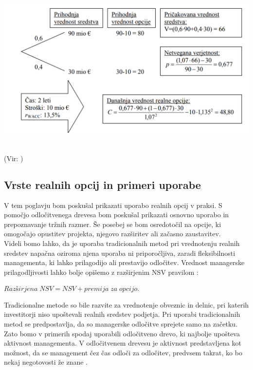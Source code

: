 \includegraphics[width=15cm, height=9cm]{binomski_model}
(Vir: \cite[str. 24]{Mohar})

\subsection{Vrste realnih opcij in primeri uporabe}
V tem poglavju bom poskušal prikazati uporabo realnih opcij v praksi. S pomočjo odločitvenega drevesa bom poskušal prikazati osnovno uporabo in prepoznavanje tržnih razmer. Še posebej se bom osredotočil na opcije, ki omogočajo opustitev projekta, njegovo razširitev ali začasno zaustavitev. \\

Videli bomo lahko, da je uporaba tradicionalnih metod pri vrednotenju realnih sredstev napačna oziroma njena uporaba ni priporočljiva, zaradi fleksibilnosti managementa, ki lahko prilagodijo ali prestavijo odločitev. Vrednost managerske prilagodljivosti lahko bolje opišemo z razširjenim NSV pravilom \cite[str. 151, 152]{Trigeorgis}:
\begin{center}
$Razširjena\;NSV = NSV + premija\;za\;opcijo$.
\end{center}
Tradicionalne metode so bile razvite za vrednotenje obveznic in delnic, pri katerih investitorji niso upoštevali realnih sredstev podjetja. Pri uporabi tradicionalnih metod se predpostavlja, da so managerske odločitve sprejete samo na začetku. Zato bomo v primerih spodaj uporabili odločitveno drevo, ki najbolje upošteva aktivnost managementa. V odločitvenem drevesu je aktivnost predstavljena kot možnost, da se management čez čas odloči za odločitev, predvsem takrat, ko bo nekaj negotovosti že znane \cite[str. 152]{Trigeorgis}. \\

